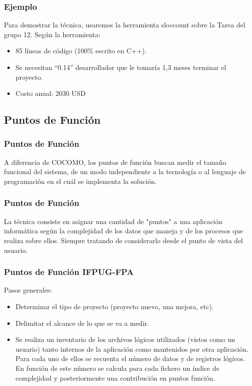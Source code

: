 \documentclass[12pt]{beamer}
\begin{document}
\begin{frame}
 \frametitle{Ejemplo}
 Para demostrar la técnica, usaremos la herramienta \alert{sloccount} sobre la Tarea del grupo 12. Según la herramienta:
    \begin{itemize}
     \item<2-> 85 líneas de código (100\% escrito en C++).
     \item<3-> Se necesitan ``0.14'' desarrollador que le tomaría 1,3 meses terminar el proyecto.
     \item<3-> Costo anual: 2030 USD
    \end{itemize}
\end{frame}

\subsection{Puntos de Función}

\begin{frame}
 \frametitle{Puntos de Función}
 A diferencia de COCOMO, los puntos de función buscan medir el tamaño funcional del sistema, de un modo independiente a la tecnología o al lenguaje de programación en el cuál se implementa la solución.
\end{frame}


\begin{frame}
 \frametitle{Puntos de Función}
 La técnica consiste en asignar una cantidad de "puntos" a una aplicación informática según la complejidad de los datos que maneja y de los procesos que realiza sobre ellos. Siempre tratando de considerarlo desde el punto de vista del \alert{usuario}.
\end{frame}

\begin{frame}
 \frametitle{Puntos de Función IFPUG-FPA}
 Pasos generales:
 \begin{itemize}
  \item<2-> Determinar el tipo de proyecto (proyecto nuevo, una mejora, etc).
  \item<3-> Delimitar el alcance de lo que se va a medir.
  \item<4-> Se realiza un inventario de los archivos lógicos utilizados (vistos como un usuario) tanto internos de la aplicación como mantenidos por otra aplicación. Para cada uno de ellos se recuenta el número de datos y de registros lógicos. En función de este número se calcula para cada fichero un índice de complejidad y posteriormente una contribución en puntos función.
 \end{itemize}
\end{frame}
\end{document}
